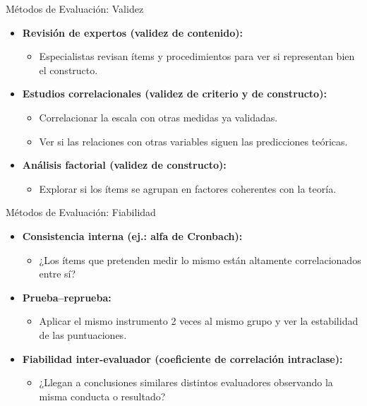 ﻿\documentclass{beamer}
\begin{document}
\begin{frame}{Métodos de Evaluación: Validez}
\begin{itemize}
    \item \textbf{Revisión de expertos (validez de contenido):}
    \begin{itemize}
         \item Especialistas revisan ítems y procedimientos para ver si representan bien el constructo.
    \end{itemize}
    \item \textbf{Estudios correlacionales (validez de criterio y de constructo):}
    \begin{itemize}
         \item Correlacionar la escala con otras medidas ya validadas.
         \item Ver si las relaciones con otras variables siguen las predicciones teóricas.
    \end{itemize}
    \item \textbf{Análisis factorial (validez de constructo):}
    \begin{itemize}
         \item Explorar si los ítems se agrupan en factores coherentes con la teoría.
    \end{itemize}
\end{itemize}
\end{frame}

\begin{frame}{Métodos de Evaluación: Fiabilidad}
\begin{itemize}
    \item \textbf{Consistencia interna (ej.: alfa de Cronbach):}
    \begin{itemize}
         \item ¿Los ítems que pretenden medir lo mismo están altamente correlacionados entre sí?
    \end{itemize}
    \item \textbf{Prueba–reprueba:}
    \begin{itemize}
         \item Aplicar el mismo instrumento 2 veces al mismo grupo y ver la estabilidad de las puntuaciones.
    \end{itemize}
    \item \textbf{Fiabilidad inter-evaluador (coeficiente de correlación intraclase):}
    \begin{itemize}
         \item ¿Llegan a conclusiones similares distintos evaluadores observando la misma conducta o resultado?
    \end{itemize}
\end{itemize}
\end{frame}
\end{document}
